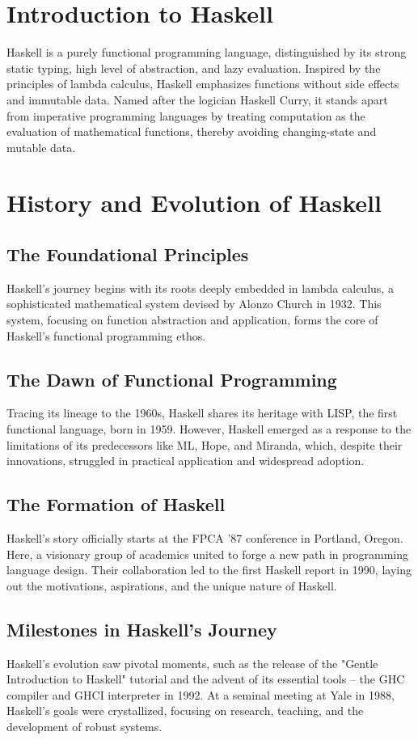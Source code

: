 \documentclass[a4paper, 10pt]{article}
\begin{document}
	\section{Introduction to Haskell}
        \noindent Haskell is a purely functional programming language, distinguished by its strong static typing, high level of abstraction, and lazy evaluation. Inspired by the principles of lambda calculus, Haskell emphasizes functions without side effects and immutable data. Named after the logician Haskell Curry, it stands apart from imperative programming languages by treating computation as the evaluation of mathematical functions, thereby avoiding changing-state and mutable data.
	\section{History and Evolution of Haskell}
        \subsection{The Foundational Principles}
            Haskell's journey begins with its roots deeply embedded in lambda calculus, a sophisticated mathematical system devised by Alonzo Church in 1932. This system, focusing on function abstraction and application, forms the core of Haskell's functional programming ethos.

        \subsection{The Dawn of Functional Programming}
            Tracing its lineage to the 1960s, Haskell shares its heritage with LISP, the first functional language, born in 1959. However, Haskell emerged as a response to the limitations of its predecessors like ML, Hope, and Miranda, which, despite their innovations, struggled in practical application and widespread adoption.

        \subsection{The Formation of Haskell}
            Haskell's story officially starts at the FPCA '87 conference in Portland, Oregon. Here, a visionary group of academics united to forge a new path in programming language design. Their collaboration led to the first Haskell report in 1990, laying out the motivations, aspirations, and the unique nature of Haskell.

        \subsection{Milestones in Haskell’s Journey}
            Haskell's evolution saw pivotal moments, such as the release of the "Gentle Introduction to Haskell" tutorial and the advent of its essential tools – the GHC compiler and GHCI interpreter in 1992. At a seminal meeting at Yale in 1988, Haskell's goals were crystallized, focusing on research, teaching, and the development of robust systems.
\end{document}
